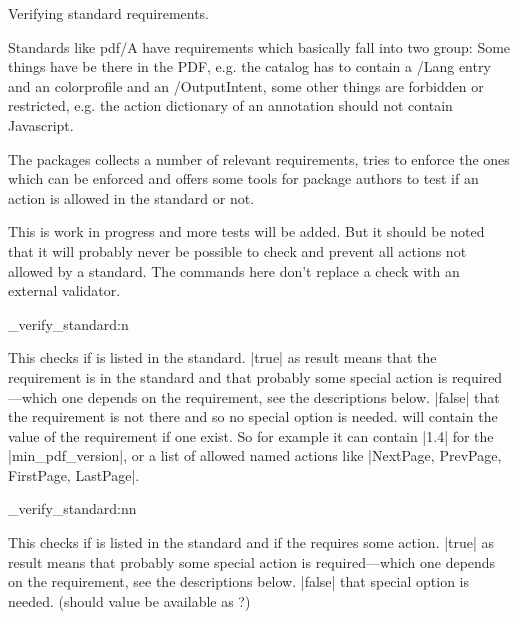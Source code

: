 \documentclass{l3doc}
\begin{document}
Verifying standard requirements.

Standards like pdf/A have requirements which basically fall into two group: Some things have be there in the PDF, e.g. the catalog has to contain a /Lang entry and an colorprofile and an /OutputIntent, some other things are forbidden or restricted, e.g. the action dictionary of an annotation should not contain Javascript.

The  packages collects a number of relevant requirements, tries to enforce the ones which can be enforced and offers some tools for package authors to test if an action is allowed in the standard or not.

This is work in progress and more tests will be added. But it should be noted that it will probably never be possible to check and prevent all actions not allowed by a standard. The commands here don't replace a check with an external validator.


\begin{function}[pTF]{\pdfmeta_verify_standard:n}
\begin{syntax}
\end{syntax}

This checks if  is listed in the standard. |true| as result means that the requirement is in the standard and that probably some special action is required---which one depends on the requirement, see the descriptions below.
|false| that the requirement is not there and so no special option is needed.
 will contain the value of the requirement if one exist. So for example it can contain |1.4| for the |min_pdf_version|, or a list of allowed named actions like |NextPage, PrevPage, FirstPage, LastPage|. 
\end{function}

\begin{function}[pTF]{\pdfmeta_verify_standard:nn}
\begin{syntax}
\end{syntax}

This checks if  is listed in the standard and if the  requires some action.
|true| as result means that probably some special action is required---which one depends on the requirement, see the descriptions below. |false| that special option is needed. (should value be available as ?)
\end{function}
\end{document}
